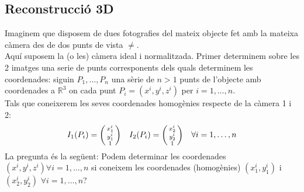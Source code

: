 \documentclass[a4paper,12pt]{article}
\begin{document}
	\subsection{Reconstrucció 3D}
	Imaginem que disposem de dues fotografies del mateix objecte fet amb la mateixa càmera des de dos punts de vista $\neq$.\\
	Aquí suposem la (o les) càmera ideal i normalitzada. Primer determinem sobre les 2 imatges una serie de punts corresponents dels quals determinem les coordenades:
	siguin $P_1, \dots, P_n$ una sèrie de $n > 1$ punts de l'objecte amb coordenades a $\mathbb{R}^3$ on cada punt $P_i = \left(x^i, y^i, z^i\right)$ per $i = 1, \dots, n$.\\
	Tals que coneixerem les seves coordenades homogènies respecte de la càmera 1 i 2:
	\begin{displaymath}
		I_1(P_i) = \begin{psmallmatrix}x_1^i\\y_1^i\\1\end{psmallmatrix}\quad I_2(P_i) = \begin{psmallmatrix}x_2^i\\y_2^i\\1\end{psmallmatrix} \quad \forall i = 1, \dots, n
	\end{displaymath}
	La pregunta és la següent: Podem determinar les coordenades $(x^i, y^i, z^i) \forall i = 1, \dots, n$ si coneixem les coordenades (homogènies) $(x_1^i, y_1^i)$ i $(x_2^i, y_2^i)$ $\forall i = 1, \dots, n$?
\end{document}
